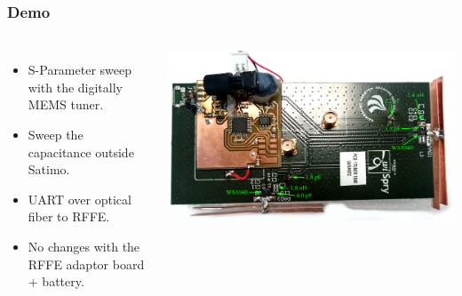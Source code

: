 \begin{frame}
  \frametitle{Demo}
  \begin{columns}[onlytextwidth,t]
    \begin{itemize}
    \item S-Parameter sweep with the digitally MEMS tuner.
    \item Sweep the capacitance outside Satimo.
    \item UART over optical fiber to RFFE.
    \item No changes with the RFFE adaptor board + battery.
    \end{itemize}
        \begin{center}
            \includegraphics[scale=0.5, angle =90]{img/Lasse/lassedouble.pdf}
        \end{center}
    \end{columns}
\end{frame}
